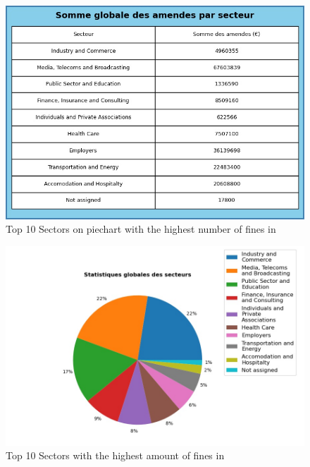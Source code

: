 \documentclass[12pt]{article}
\begin{document}
		
	\begin{multicols}{2}
	\begin{figure}
		[H]\centering\includegraphics[width=1.0\linewidth]{graphs/sector_data_year_fines}
		\caption{Top 10 Sectors on piechart with the highest number of fines in }
	\end{figure}
	\begin{figure}
		[H]\centering\includegraphics[width=1\linewidth]{graphs/sector_data_year}
		\caption{Top 10 Sectors with the highest amount of fines in }
	 \end{figure}
	
	\end{multicols}
\end{document}
